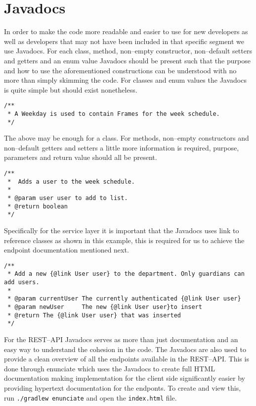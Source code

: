 \newpage
\section{Javadocs}
In order to make the code more readable and easier to use for new developers as well as developers that may not have been included in that specific segment we use Javadocs.
For each class, method, non--empty constructor, non--default setters and getters and an enum value Javadocs should be present such that the purpose and how to use the aforementioned constructions can be understood with no more than simply skimming the code.
For classes and enum values the Javadocs is quite simple but should exist nonetheless.

\begin{lstlisting}
/**
 * A Weekday is used to contain Frames for the week schedule.
 */
\end{lstlisting}

The above may be enough for a class.
For methods, non--empty constructors and non--default getters and setters a little more information is required, purpose, parameters and return value should all be present.

\begin{lstlisting}
/**
 *  Adds a user to the week schedule.
 *
 * @param user user to add to list.
 * @return boolean
 */
\end{lstlisting}

Specifically for the service layer it is important that the Javadocs uses link to reference classes as shown in this example, this is required for us to achieve the endpoint documentation mentioned next.

\begin{lstlisting}
/**
 * Add a new {@link User user} to the department. Only guardians can add users.
 *
 * @param currentUser The currently authenticated {@link User user}
 * @param newUser     The new {@link User user}to insert
 * @return The {@link User user} that was inserted
 */
\end{lstlisting}

For the REST--API Javadocs serves as more than just documentation and an easy way to understand the cohesion in the code.
The Javadocs are also used to provide a clean overview of all the endpoints available in the REST--API.
This is done through enunciate which uses the Javadocs to create full HTML documentation making implementation for the client side significantly easier by providing hypertext documentation for the endponts.
To create and view this, run \texttt{./gradlew enunciate} and open the \texttt{index.html} file.
